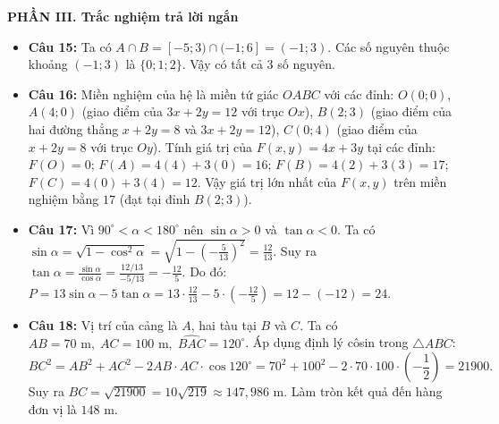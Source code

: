 \documentclass[12pt,a4paper]{article}
\begin{document}
\vspace{0.15cm}
\textbf{PHẦN III. Trắc nghiệm trả lời ngắn}
\begin{itemize}[leftmargin=0.6cm, itemsep=1.5pt, topsep=1pt]
    \item \textbf{Câu 15:} Ta có $A \cap B = [-5; 3) \cap (-1; 6] = (-1; 3)$.
    Các số nguyên thuộc khoảng $(-1; 3)$ là $\{0; 1; 2\}$. Vậy có tất cả $3$ số nguyên.
    \item \textbf{Câu 16:} Miền nghiệm của hệ là miền tứ giác $OABC$ với các đỉnh:
    $O(0; 0)$, $A(4; 0)$ (giao điểm của $3x + 2y = 12$ với trục $Ox$), $B(2; 3)$ (giao điểm của hai đường thẳng $x + 2y = 8$ và $3x + 2y = 12$), $C(0; 4)$ (giao điểm của $x + 2y = 8$ với trục $Oy$).
    Tính giá trị của $F(x, y) = 4x + 3y$ tại các đỉnh: $F(O) = 0$; $F(A) = 4(4) + 3(0) = 16$; $F(B) = 4(2) + 3(3) = 17$; $F(C) = 4(0) + 3(4) = 12$.
    Vậy giá trị lớn nhất của $F(x, y)$ trên miền nghiệm bằng $17$ (đạt tại đỉnh $B(2; 3)$).
    \item \textbf{Câu 17:} Vì $90^\circ < \alpha < 180^\circ$ nên $\sin \alpha > 0$ và $\tan \alpha < 0$.
    Ta có $\sin \alpha = \sqrt{1 - \cos^2 \alpha} = \sqrt{1 - \left(-\frac{5}{13}\right)^2} = \frac{12}{13}$.
    Suy ra $\tan \alpha = \frac{\sin \alpha}{\cos \alpha} = \frac{12/13}{-5/13} = -\frac{12}{5}$.
    Do đó: $P = 13\sin \alpha - 5\tan \alpha = 13 \cdot \frac{12}{13} - 5 \cdot \left(-\frac{12}{5}\right) = 12 - (-12) = 24$.
    \item \textbf{Câu 18:} Vị trí của cảng là $A$, hai tàu tại $B$ và $C$. Ta có $AB = 70\text{ m},\; AC = 100\text{ m},\; \widehat{BAC} = 120^\circ$.
    Áp dụng định lý côsin trong $\triangle ABC$:
    \[
    BC^2 = AB^2 + AC^2 - 2 AB \cdot AC \cdot \cos 120^\circ = 70^2 + 100^2 - 2 \cdot 70 \cdot 100 \cdot \left(-\dfrac{1}{2}\right) = 21900.
    \]
    Suy ra $BC = \sqrt{21900} = 10\sqrt{219} \approx 147{,}986\text{ m}$. Làm tròn kết quả đến hàng đơn vị là $148\text{ m}$.
\end{itemize}
\end{document}
